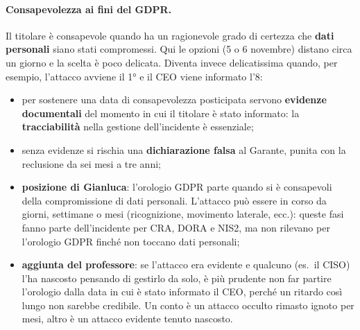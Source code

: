 \paragraph{Consapevolezza ai fini del GDPR.}
Il titolare è consapevole quando ha un ragionevole grado di certezza che \textbf{dati personali}
siano stati compromessi. Qui le opzioni (5 o 6 novembre) distano circa un giorno e la scelta è poco
delicata. Diventa invece delicatissima quando, per esempio, l'attacco avviene il 1° e il CEO viene
informato l'8:
\begin{itemize}
  \item per sostenere una data di consapevolezza posticipata servono \textbf{evidenze documentali} del
    momento in cui il titolare è stato informato: la \textbf{tracciabilità} nella gestione
    dell'incidente è essenziale;
  \item senza evidenze si rischia una \textbf{dichiarazione falsa} al Garante, punita con la
    reclusione da sei mesi a tre anni;
  \item \textbf{posizione di Gianluca}: l'orologio GDPR parte quando si è consapevoli della
    compromissione di dati personali. L'attacco può essere in corso da giorni, settimane o mesi
    (ricognizione, movimento laterale, ecc.): queste fasi fanno parte dell'incidente per CRA, DORA e
    NIS2, ma non rilevano per l'orologio GDPR finché non toccano dati personali;
  \item \textbf{aggiunta del professore}: se l'attacco era evidente e qualcuno (es.\ il CISO) l'ha
    nascosto pensando di gestirlo da solo, è più prudente non far partire l'orologio dalla data in
    cui è stato informato il CEO, perché un ritardo così lungo non sarebbe credibile. Un conto è un
    attacco occulto rimasto ignoto per mesi, altro è un attacco evidente tenuto nascosto.
\end{itemize}

